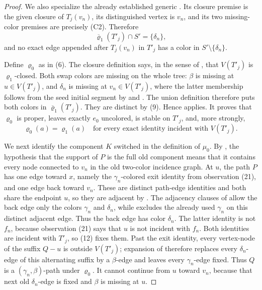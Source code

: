 \begin{proof}
We also specialize the already established generic
.  Its closure premise is the
given closure of \(T_j(v_n)\), its distinguished vertex is \(v_n\), and
its two missing-color premises are precisely (C2).  Therefore
\[
 \overline{\varrho}_1(T'_j)\cap S'=\{\delta_n\},               \tag{11}
\]
and no exact edge appended after \(T_j(v_n)\) in \(T'_j\) has a color in
\(S'\setminus\{\delta_n\}\).

Define \(\varrho_0\) as in (6).  The closure definition
 says, in the sense of
, that \(V(T'_j)\) is
\(\varrho_1\)-closed.  Both swap colors are missing on the whole tree:
\(\beta\) is missing at \(u\in V(T'_j)\), and \(\delta_n\) is missing at
\(v_n\in V(T'_j)\), where the latter membership follows from the seed
initial segment by  and
.  The union definition
 therefore puts both colors in
\(\overline{\varrho}_1(T'_j)\).  They are distinct by (9).  Hence
 applies.  It proves that
\(\varrho_0\) is proper, leaves exactly \(e_0\) uncolored, is stable on
\(T'_j\), and, more strongly,
\[
 \varrho_0(a)=\varrho_1(a)
 \quad\text{for every exact identity incident with }V(T'_j). \tag{12}
\]

We next identify the component \(K\) switched in the definition of
\(\mu_0\).  By , the hypothesis that the support
of \(P\) is the full old component means that it contains every node
connected to \(v_n\) in the old two-color incidence graph.  At \(u\), the
path \(P\) has one edge toward \(x\), namely
the \(\gamma_n\)-colored exit identity from observation (21), and one
edge back toward \(v_n\).  These are distinct path-edge identities and
both share the endpoint \(u\), so they are adjacent by
.  The adjacency clauses of
 allow the back edge only the colors
\(\gamma_n\) and \(\delta_n\), while 
excludes the already used \(\gamma_n\) on this distinct adjacent edge.
Thus the back edge has color \(\delta_n\).  The latter identity is
not \(f_n\), because observation (21) says that \(u\) is not incident
with \(f_n\).  Both identities are incident with \(T'_j\), so (12) fixes
them.  Past the exit identity, every vertex-node of the suffix \(Q-u\)
is outside \(V(T'_j)\); expansion of
 therefore replaces every
\(\delta_n\)-edge of this alternating suffix by a \(\beta\)-edge and
leaves every \(\gamma_n\)-edge fixed.  Thus \(Q\) is a
\((\gamma_n,\beta)\)-path under \(\varrho_0\).  It cannot continue from
\(u\) toward \(v_n\), because that next old \(\delta_n\)-edge is fixed
and \(\beta\) is missing at \(u\).


\end{proof}
